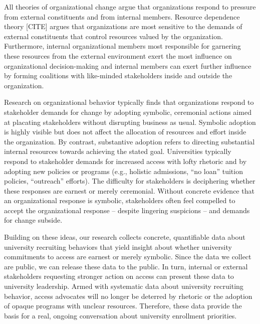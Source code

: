 \documentclass[twoside]{article}
\begin{document}
All theories of organizational change argue that organizations respond to pressure from external constituents and from internal members.  Resource dependence theory [CITE] argues that organizations are most sensitive to the demands of external constituents that control resources valued by the organization.  Furthermore, internal organizational members most responsible for garnering these resources from the external environment exert the most influence on organizational decision-making and internal members can exert further influence by forming coalitions with like-minded stakeholders inside and outside the organization.

Research on organizational behavior typically finds that organizations respond to stakeholder demands for change by adopting symbolic, ceremonial actions aimed at placating stakeholders without disrupting business as usual.  Symbolic adoption is highly visible but does not affect the allocation of resources and effort inside the organization. By contrast, substantive adoption refers to directing substantial internal resources towards achieving the stated goal. Universities typically respond to stakeholder demands for increased access with lofty rhetoric and by adopting new policies or programs (e.g., holistic admissions, ``no loan'' tuition policies, ``outreach'' efforts).  The difficulty for stakeholders is deciphering whether these responses are earnest or merely ceremonial. Without concrete evidence that an organizational response is symbolic, stakeholders often feel compelled to accept the organizational response -- despite lingering suspicions -- and demands for change subside.

Building on these ideas, our research collects concrete, quantifiable data about university recruiting behaviors that yield insight about whether university commitments to access are earnest or merely symbolic.  Since the data we collect are public, we can release these data to the public. In turn, internal or external stakeholders requesting stronger action on access can present these data to university leadership.  Armed with systematic data about university recruiting behavior, access advocates will no longer be deterred by rhetoric or the adoption of opaque programs with unclear resources.  Therefore, these data provide the basis for a real, ongoing conversation about university enrollment priorities.  
\end{document}
